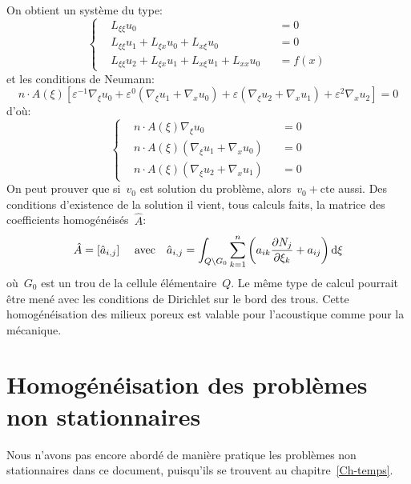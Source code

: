 On obtient un système du type:
\begin{equation}\left\{
\begin{aligned}
&L_{\xi\xi} u_0 &&=0\\
&L_{\xi\xi}u_1+L_{\xi x}u_0+L_{x\xi}u_0 &&=0\\
&L_{\xi\xi}u_2+L_{\xi x}u_1+L_{x\xi}u_1 +L_{xx}u_0 &&=f(x)
\end{aligned}
\right. \end{equation}
et les conditions de Neumann:
\begin{equation} n\cdot A(\xi)\left[ \varepsilon^{-1}\nabla_\xi u_0 + \varepsilon^0 (\nabla_\xi u_1+\nabla_x u_0) +
\varepsilon(\nabla_\xi u_2+\nabla_x u_1)+\varepsilon^2\nabla_x u_2
\right]=0 \end{equation}
d'où:
\begin{equation}\left\{
\begin{aligned}
&n\cdot A(\xi)\nabla_\xi u_0 &&=0\\
&n\cdot A(\xi) (\nabla_\xi u_1+\nabla_x u_0) &&=0\\
&n\cdot A(\xi)(\nabla_\xi u_2+\nabla_x u_1) &&=0
\end{aligned}
\right. \end{equation}
On peut prouver que si~$v_0$ est solution du problème, alors~$v_0+\text{cte}$ aussi.
\medskipvm
Des conditions d'existence de la solution il vient, tous calculs faits, la matrice des
coefficients homogénéisés~$\hat{A}$:
\begin{equation} \hat{A} = [\hat{a}_{i,j} ]
\quad \text{ avec}
\quad
\hat{a}_{i,j}=\displaystyle\int_{Q\backslash G_0} \displaystyle\sum_{k=1}^n \left(a_{ik} \frac{\partial N_j}{\partial\xi_k} + a_{ij}
\right) \text{d}\xi
\end{equation}
où~$G_0$ est un trou de la cellule élémentaire~$Q$.
\medskipvm
Le même type de calcul pourrait être mené avec les conditions de Dirichlet sur le bord des trous.
\medskipvm
Cette homogénéisation des milieux poreux est valable pour l'acoustique comme pour la mécanique.

\medskip
\section{Homogénéisation des problèmes non stationnaires}
Nous n'avons pas encore abordé de manière pratique les problèmes non stationnaires dans ce document, puisqu'ils se trouvent au chapitre~\ref{Ch-temps}.


